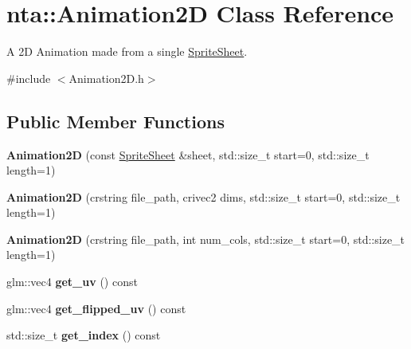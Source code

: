 \hypertarget{classnta_1_1Animation2D}{}\section{nta\+:\+:Animation2D Class Reference}
\label{classnta_1_1Animation2D}


A 2D Animation made from a single \hyperlink{structnta_1_1SpriteSheet}{Sprite\+Sheet}.  




{\ttfamily \#include $<$Animation2\+D.\+h$>$}

\subsection*{Public Member Functions}
\begin{DoxyCompactItemize}
\item 
\mbox{\label{classnta_1_1Animation2D_a13c0e7e8f15507c6547500073efc5a10}} 
{\bfseries Animation2D} (const \hyperlink{structnta_1_1SpriteSheet}{Sprite\+Sheet} \&sheet, std\+::size\+\_\+t start=0, std\+::size\+\_\+t length=1)
\item 
\mbox{\label{classnta_1_1Animation2D_acfc8437b5b740228336b38461686fdd3}} 
{\bfseries Animation2D} (crstring file\+\_\+path, crivec2 dims, std\+::size\+\_\+t start=0, std\+::size\+\_\+t length=1)
\item 
\mbox{\label{classnta_1_1Animation2D_a6e3a9430ee7dc92e9f3acfe291c8311a}} 
{\bfseries Animation2D} (crstring file\+\_\+path, int num\+\_\+cols, std\+::size\+\_\+t start=0, std\+::size\+\_\+t length=1)
\item 
\mbox{\label{classnta_1_1Animation2D_af7373ff1020b685bd583ae63ba24de55}} 
glm\+::vec4 {\bfseries get\+\_\+uv} () const
\item 
\mbox{\label{classnta_1_1Animation2D_aa46a6c17839ad28c1f6b4c04537b237a}} 
glm\+::vec4 {\bfseries get\+\_\+flipped\+\_\+uv} () const
\item 
\mbox{\label{classnta_1_1Animation2D_ac446522438b03f14a532907ba5c3d5af}} 
std\+::size\+\_\+t {\bfseries get\+\_\+index} () const

\end{DoxyCompactItemize}
